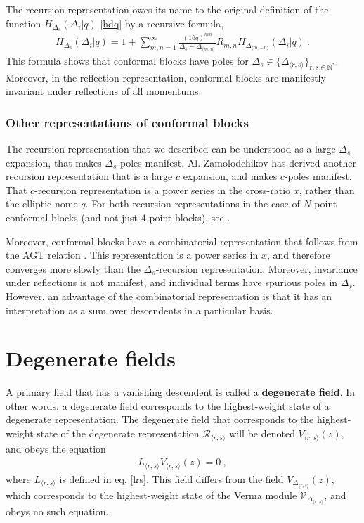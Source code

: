 \documentclass[12pt, a4paper, notitlepage, twoside]{report}
\numberwithin{equation}{section}
\theoremstyle{break}
\begin{document}
The recursion representation owes its name to the original definition of the function $H_{\Delta_s}(\Delta_i|q)$ \eqref{hdq} by a recursive formula,
\begin{align}
 H_{\Delta_s}(\Delta_i|q) = 1 + \sum_{m,n=1}^\infty \frac{(16q)^{mn}}{\Delta_s-\Delta_{\langle m,n\rangle}} R_{m,n} H_{\Delta_{\langle m,-n\rangle}}(\Delta_i|q)\ .
 \label{hrec}
\end{align}
This formula shows that conformal blocks have poles for $\Delta_s \in \{\Delta_{\langle r,s\rangle}\}_{r,s\in {\mathbb{N}}^*}$.
Moreover, in the reflection representation, conformal blocks are manifestly invariant under reflections of all momentums.

\subsubsection{Other representations of conformal blocks}

The recursion representation that we described can be understood as a large $\Delta_s$ expansion, that makes $\Delta_s$-poles manifest. Al. Zamolodchikov has derived another recursion representation that is a large $c$ expansion, and makes $c$-poles manifest. That $c$-recursion representation is a power series in the cross-ratio $x$, rather than the elliptic nome $q$. For both recursion representations in the case of $N$-point conformal blocks (and not just $4$-point blocks), see \cite{ccy17}.

Moreover, conformal blocks have a combinatorial representation that follows from the AGT relation \cite{aflt10}. 
This representation is a power series in $x$, and therefore converges more slowly than the $\Delta_s$-recursion representation. 
Moreover, invariance under reflections is not manifest, and individual terms have spurious poles in $\Delta_s$.
However, an advantage of the combinatorial representation is that it has an interpretation as a sum over descendents in a particular basis.

\section{Degenerate fields}\label{sec:degf}

A primary field that has a vanishing descendent is called a \textbf{\boldmath degenerate field}.
In other words, a degenerate field corresponds to the highest-weight state of a degenerate representation.
The degenerate field that corresponds to the highest-weight state of the degenerate representation $\mathcal{R}_{\langle r,s \rangle}$ will be denoted $V_{\langle r,s\rangle}(z)$, and obeys the equation 
\begin{align}
 L_{\langle r,s \rangle} V_{\langle r,s \rangle}(z) = 0 \ , 
\label{lrsv}
\end{align}
where $L_{\langle r,s \rangle}$ is defined in eq. \eqref{lrs}.
This field differs from the field $V_{\Delta_{\langle r,s \rangle}}(z)$, which corresponds to the highest-weight state of the Verma module $\mathcal{V}_{\Delta_{\langle r,s \rangle}}$, and obeys no such equation.
\end{document}
